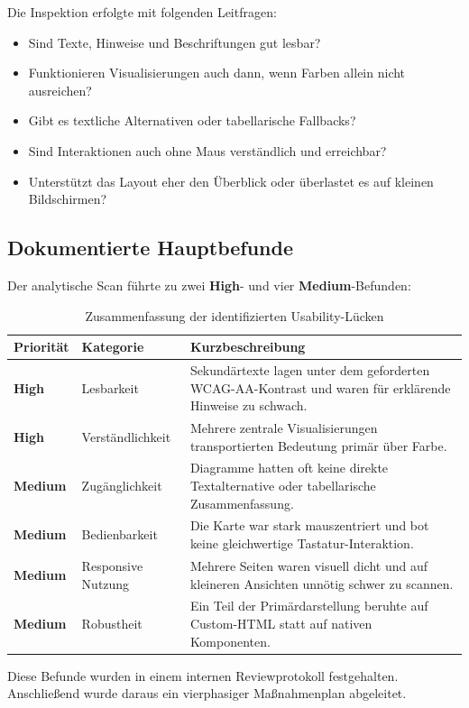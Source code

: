 \documentclass[11pt,a4paper]{article}
\begin{document}
Die Inspektion erfolgte mit folgenden Leitfragen:

\begin{itemize}[leftmargin=1.2cm]
\item Sind Texte, Hinweise und Beschriftungen gut lesbar?
\item Funktionieren Visualisierungen auch dann, wenn Farben allein nicht ausreichen?
\item Gibt es textliche Alternativen oder tabellarische Fallbacks?
\item Sind Interaktionen auch ohne Maus verständlich und erreichbar?
\item Unterstützt das Layout eher den Überblick oder überlastet es auf kleinen Bildschirmen?
\end{itemize}

\subsection{Dokumentierte Hauptbefunde}
Der analytische Scan führte zu zwei \textbf{High}- und vier \textbf{Medium}-Befunden:

\begin{table}[H]
\centering
\caption{Zusammenfassung der identifizierten Usability-Lücken}
\begin{tabularx}{\textwidth}{>{\bfseries}l l X}
\toprule
Priorität & Kategorie & Kurzbeschreibung \\
\midrule
High & Lesbarkeit & Sekundärtexte lagen unter dem geforderten WCAG-AA-Kontrast und waren für erklärende Hinweise zu schwach. \\
High & Verständlichkeit & Mehrere zentrale Visualisierungen transportierten Bedeutung primär über Farbe. \\
Medium & Zugänglichkeit & Diagramme hatten oft keine direkte Textalternative oder tabellarische Zusammenfassung. \\
Medium & Bedienbarkeit & Die Karte war stark mauszentriert und bot keine gleichwertige Tastatur-Interaktion. \\
Medium & Responsive Nutzung & Mehrere Seiten waren visuell dicht und auf kleineren Ansichten unnötig schwer zu scannen. \\
Medium & Robustheit & Ein Teil der Primärdarstellung beruhte auf Custom-HTML statt auf nativen Komponenten. \\
\bottomrule
\end{tabularx}
\end{table}

Diese Befunde wurden in einem internen Reviewprotokoll festgehalten. Anschließend wurde daraus ein vierphasiger Maßnahmenplan abgeleitet.
\end{document}
